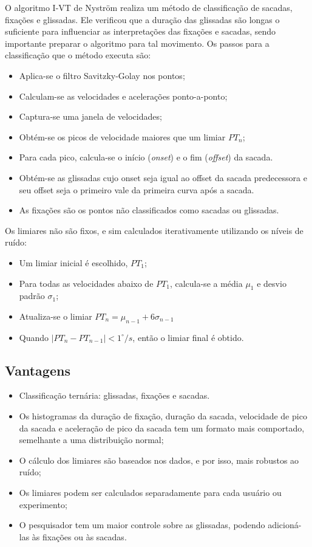 \documentclass[brazil,]{report}
\begin{document}
O algoritmo \gls{I-VT} de Nyström realiza um método de classificação de
sacadas, fixações e glissadas. Ele verificou que a duração das glissadas
são longas o suficiente para influenciar as interpretações das fixações
e sacadas, sendo importante preparar o algoritmo para tal movimento. Os
passos para a classificação que o método executa são:

\begin{itemize}
\itemsep1pt\parskip0pt
\item
  Aplica-se o filtro Savitzky-Golay nos pontos;
\item
  Calculam-se as velocidades e acelerações ponto-a-ponto;
\item
  Captura-se uma janela de velocidades;
\item
  Obtém-se os picos de velocidade maiores que um limiar $PT_n$;
\item
  Para cada pico, calcula-se o início (\emph{onset}) e o fim
  (\emph{offset}) da sacada.
\item
  Obtém-se as glissadas cujo onset seja igual ao offset da sacada
  predecessora e seu offset seja o primeiro vale da primeira curva após
  a sacada.
\item
  As fixações são os pontos não classificados como sacadas ou glissadas.
\end{itemize}

Os limiares não são fixos, e sim calculados iterativamente utilizando os
níveis de ruído:

\begin{itemize}
\itemsep1pt\parskip0pt
\item
  Um limiar inicial é escolhido, $PT_1$;
\item
  Para todas as velocidades abaixo de $PT_1$, calcula-se a média $\mu_1$
  e desvio padrão $\sigma_1$;
\item
  Atualiza-se o limiar $PT_n = \mu_{n-1} + 6\sigma_{n-1}$
\item
  Quando $|PT_n-PT_{n-1}| < 1^\circ/s$, então o limiar final é obtido.
\end{itemize}

\subsection{Vantagens}\label{vantagens-6}

\begin{itemize}
\itemsep1pt\parskip0pt
\item
  Classificação ternária: glissadas, fixações e sacadas.
\item
  Os histogramas da duração de fixação, duração da sacada, velocidade de
  pico da sacada e aceleração de pico da sacada tem um formato mais
  comportado, semelhante a uma distribuição normal;
\item
  O cálculo dos limiares são baseados nos dados, e por isso, mais
  robustos ao ruído;
\item
  Os limiares podem ser calculados separadamente para cada usuário ou
  experimento;
\item
  O pesquisador tem um maior controle sobre as glissadas, podendo
  adicioná-las às fixações ou às sacadas.
\end{itemize}
\end{document}
